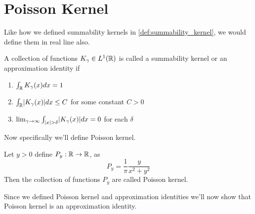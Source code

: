 \section{Poisson Kernel}
  Like how we defined summability kernels in \autoref{def:summability_kernel}, we would define them in real line also.

\begin{definition}
  \label{def:summability_kernel_in_R}
  A collection of functions $K_\gamma \in L^1(\mathbb R)$ is called a summability kernel or an approximation identity if 
    \begin{enumerate}[label=(\alph*)]
      \item $\int_\mathbb R K_\gamma(x)dx = 1$
      \item $\int_\mathbb R\lvert K_\gamma(x)\rvert dx \le C$ for some constant $C>0$
      \item $\lim_{\gamma \to \infty} \int_{|x| > \delta}\lvert K_\gamma(x)\rvert dx = 0$ for each $\delta$
    \end{enumerate}
  \end{definition}

  Now specifically we'll define Poisson kernel.
\begin{definition}
  \label{def:poisson_kernel}
  Let $y>0$ define $P_y : \mathbb R \to \mathbb R$, as $$P_y = \frac{1}{\pi}\frac{y}{x^2 + y^2}$$
  Then the collection of functions $P_y$ are called Poisson kernel.
\end{definition}

Since we defined Poisson kernel and approximation identities we'll now show that Poisson kernel is an approximation identity.

